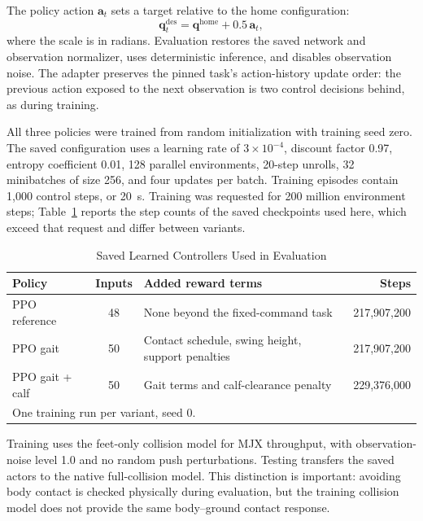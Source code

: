 \documentclass[conference]{IEEEtran}
\begin{document}
The policy action $\mathbf a_t$ sets a target relative to the home configuration:
\begin{equation}
\mathbf q_t^{\mathrm{des}}=\mathbf q^{\mathrm{home}}+0.5\,\mathbf a_t,
\label{eq:action}
\end{equation}
where the scale is in radians. Evaluation restores the saved network and observation normalizer, uses deterministic inference, and disables observation noise. The adapter preserves the pinned task's action-history update order: the previous action exposed to the next observation is two control decisions behind, as during training.

All three policies were trained from random initialization with training seed zero. The saved configuration uses a learning rate of $3\times10^{-4}$, discount factor 0.97, entropy coefficient 0.01, 128 parallel environments, 20-step unrolls, 32 minibatches of size 256, and four updates per batch. Training episodes contain 1,000 control steps, or 20~s. Training was requested for 200 million environment steps; Table~\ref{tab:policies} reports the step counts of the saved checkpoints used here, which exceed that request and differ between variants.

\begin{table}[htbp]
\caption{Saved Learned Controllers Used in Evaluation}
\begin{center}
\footnotesize
\begin{tabular}{|p{1.45cm}|c|p{2.6cm}|r|}
\hline
\textbf{Policy} & \textbf{Inputs} & \textbf{Added reward terms} & \textbf{Steps} \\
\hline
PPO reference & 48 & None beyond the fixed-command task & 217,907,200 \\
\hline
PPO gait & 50 & Contact schedule, swing height, support penalties & 217,907,200 \\
\hline
PPO gait + calf & 50 & Gait terms and calf-clearance penalty & 229,376,000 \\
\hline
\multicolumn{4}{l}{One training run per variant, seed 0.}
\end{tabular}
\label{tab:policies}
\end{center}
\end{table}

Training uses the feet-only collision model for MJX throughput, with observation-noise level 1.0 and no random push perturbations. Testing transfers the saved actors to the native full-collision model. This distinction is important: avoiding body contact is checked physically during evaluation, but the training collision model does not provide the same body--ground contact response.
\end{document}
